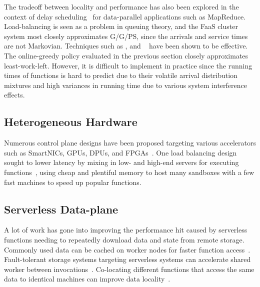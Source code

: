The tradeoff between locality and performance has also been explored in the context of delay scheduling~\cite{zaharia2010delay} for data-parallel applications such as MapReduce.
Load-balancing is seen as a  problem in queuing theory, and the FaaS cluster system most closely approximates G/G/PS, since the arrivals and service times are not Markovian.
Techniques such as , and ~\cite{gupta2007analysis} have been shown to be effective.
The online-greedy policy evaluated in the previous section closely approximates least-work-left.
However, it is difficult to implement in practice since the running times of functions is hard to predict due to their volatile arrival distribution mixtures and high variances in running time due to various system interference effects.


\subsection{Heterogeneous Hardware}

Numerous control plane designs have been proposed targeting various accelerators such as SmartNICs, GPUs, DPUs, and FPGAs~\cite{choi2020lambda,du2022serverless,pemberton2022kernel,daw2021speedo}.
One load balancing design sought to lower latency by mixing in low- and high-end servers for executing functions~\cite{roy2022icebreaker}, using cheap and plentiful memory to host many sandboxes with a few fast machines to speed up popular functions.

\subsection{Serverless Data-plane}

A lot of work has gone into improving the performance hit caused by serverless functions needing to repeatedly download data and state from remote storage.
Commonly used data can be cached on worker nodes for faster function access~\cite{mvondo2021ofc,romero2021faa}.
Fault-tolerant storage systems targeting serverless systems can accelerate shared worker between invocations~\cite{giantsidi2023flexlog,sreekanti2020fault}.
Co-locating different functions that access the same data to identical machines can improve data locality~\cite{abdi2023palette}.

